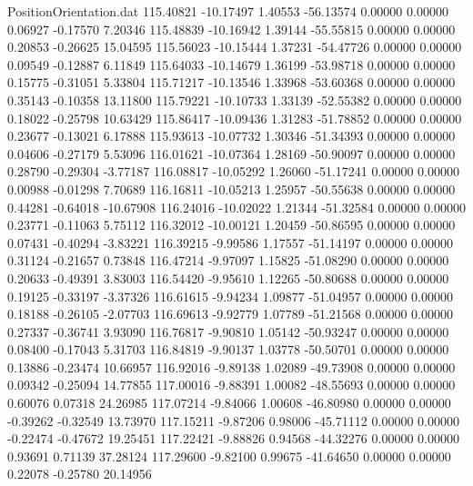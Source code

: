 \begin{filecontents}{PositionOrientation.dat}
 115.40821  -10.17497    1.40553   -56.13574    0.00000    0.00000    0.06927   -0.17570    7.20346
 115.48839  -10.16942    1.39144   -55.55815    0.00000    0.00000    0.20853   -0.26625   15.04595
 115.56023  -10.15444    1.37231   -54.47726    0.00000    0.00000    0.09549   -0.12887    6.11849
 115.64033  -10.14679    1.36199   -53.98718    0.00000    0.00000    0.15775   -0.31051    5.33804
 115.71217  -10.13546    1.33968   -53.60368    0.00000    0.00000    0.35143   -0.10358   13.11800
 115.79221  -10.10733    1.33139   -52.55382    0.00000    0.00000    0.18022   -0.25798   10.63429
 115.86417  -10.09436    1.31283   -51.78852    0.00000    0.00000    0.23677   -0.13021    6.17888
 115.93613  -10.07732    1.30346   -51.34393    0.00000    0.00000    0.04606   -0.27179    5.53096
 116.01621  -10.07364    1.28169   -50.90097    0.00000    0.00000    0.28790   -0.29304   -3.77187
 116.08817  -10.05292    1.26060   -51.17241    0.00000    0.00000    0.00988   -0.01298    7.70689
 116.16811  -10.05213    1.25957   -50.55638    0.00000    0.00000    0.44281   -0.64018  -10.67908
 116.24016  -10.02022    1.21344   -51.32584    0.00000    0.00000    0.23771   -0.11063    5.75112
 116.32012  -10.00121    1.20459   -50.86595    0.00000    0.00000    0.07431   -0.40294   -3.83221
 116.39215   -9.99586    1.17557   -51.14197    0.00000    0.00000    0.31124   -0.21657    0.73848
 116.47214   -9.97097    1.15825   -51.08290    0.00000    0.00000    0.20633   -0.49391    3.83003
 116.54420   -9.95610    1.12265   -50.80688    0.00000    0.00000    0.19125   -0.33197   -3.37326
 116.61615   -9.94234    1.09877   -51.04957    0.00000    0.00000    0.18188   -0.26105   -2.07703
 116.69613   -9.92779    1.07789   -51.21568    0.00000    0.00000    0.27337   -0.36741    3.93090
 116.76817   -9.90810    1.05142   -50.93247    0.00000    0.00000    0.08400   -0.17043    5.31703
 116.84819   -9.90137    1.03778   -50.50701    0.00000    0.00000    0.13886   -0.23474   10.66957
 116.92016   -9.89138    1.02089   -49.73908    0.00000    0.00000    0.09342   -0.25094   14.77855
 117.00016   -9.88391    1.00082   -48.55693    0.00000    0.00000    0.60076    0.07318   24.26985
 117.07214   -9.84066    1.00608   -46.80980    0.00000    0.00000   -0.39262   -0.32549   13.73970
 117.15211   -9.87206    0.98006   -45.71112    0.00000    0.00000   -0.22474   -0.47672   19.25451
 117.22421   -9.88826    0.94568   -44.32276    0.00000    0.00000    0.93691    0.71139   37.28124
 117.29600   -9.82100    0.99675   -41.64650    0.00000    0.00000    0.22078   -0.25780   20.14956

\end{filecontents}
